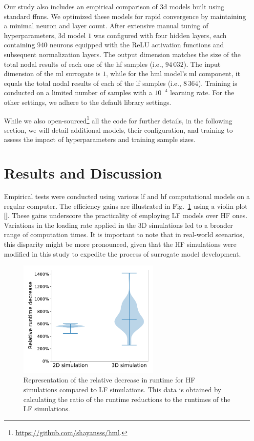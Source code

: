 Our study also includes an empirical comparison of \ac{3d} models built using standard \acp{ffnn}. We optimized these models for rapid convergence by maintaining a minimal neuron and layer count. After extensive manual tuning of hyperparameters, \ac{3d} model $1$ was configured with four hidden layers, each containing $940$ neurons equipped with the ReLU activation functions and subsequent normalization layers. The output dimension matches the size of the total nodal results of each one of the \ac{hf} samples (i.e., $94\,032$). The input dimension of the \ac{ml} surrogate is $1$, while for the \ac{hml} model's \ac{ml} component, it equals the total nodal results of each of the \ac{lf} samples (i.e., $8\,364$). Training is conducted on a limited number of samples with a $10^{-4}$ learning rate. For the other settings, we adhere to the default library settings.

While we also open-sourced\footnote{\href{https://github.com/shayansss/hml}{https://github.com/shayansss/hml}.} all the code for further details, in the following section, we will detail additional models, their configuration, and training to assess the impact of hyperparameters and training sample sizes.

\section{Results and Discussion}
%
Empirical tests were conducted using various \ac{lf} and \ac{hf} computational models on a regular computer. The efficiency gains are illustrated in Fig.~\ref{fig:runtime-comparison} using a violin plot [\cite{hintze1998}]. These gains underscore the practicality of employing LF models over HF ones. Variations in the loading rate applied in the 3D simulations led to a broader range of computation times. It is important to note that in real-world scenarios, this disparity might be more pronounced, given that the HF simulations were modified in this study to expedite the process of surrogate model development.
%
\begin{figure}\centering
\includegraphics[trim={0cm 0.5cm 0cm 0cm},clip,width=7cm]{comparison.pdf}
\caption{Representation of the relative decrease in runtime for HF simulations compared to LF simulations. This data is obtained by calculating the ratio of the runtime reductions to the runtimes of the LF simulations.\label{fig:runtime-comparison}}
\end{figure}

